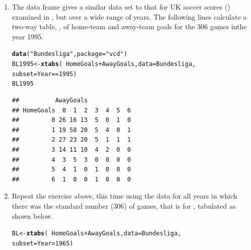 \documentclass[11pt]{book}\usepackage[]{graphicx}\usepackage[]{color}
\makeatletter
\newcommand{\hlnum}[1]{\textcolor[rgb]{0.686,0.059,0.569}{#1}}%
\newcommand{\hlstr}[1]{\textcolor[rgb]{0.192,0.494,0.8}{#1}}%
\newcommand{\hlopt}[1]{\textcolor[rgb]{0,0,0}{#1}}%
\newcommand{\hlstd}[1]{\textcolor[rgb]{0.345,0.345,0.345}{#1}}%
\newcommand{\hlkwb}[1]{\textcolor[rgb]{0.69,0.353,0.396}{#1}}%
\newcommand{\hlkwc}[1]{\textcolor[rgb]{0.333,0.667,0.333}{#1}}%
\newcommand{\hlkwd}[1]{\textcolor[rgb]{0.737,0.353,0.396}{\textbf{#1}}}%
\newenvironment{kframe}{%
 \def\at@end@of@kframe{}%
 \ifinner\ifhmode%
  \def\at@end@of@kframe{\end{minipage}}%
  \begin{minipage}{\columnwidth}%
 \fi\fi%
 \def\FrameCommand##1{\hskip\@totalleftmargin \hskip-\fboxsep
 \colorbox{shadecolor}{##1}\hskip-\fboxsep
     \hskip-\linewidth \hskip-\@totalleftmargin \hskip\columnwidth}%
 \MakeFramed {\advance\hsize-\width
   \@totalleftmargin\z@ \linewidth\hsize
   \@setminipage}}%
 {\par\unskip\endMakeFramed%
 \at@end@of@kframe}
\newenvironment{knitrout}{}{} %
\renewenvironment{knitrout}{\small\renewcommand{\baselinestretch}{.85}}{} %
\makeatother
\begin{document}
\begin{enumerate}
  \item The data frame  gives a similar data set to that for UK soccer scores
  ()
  examined in , but over a wide range of years.  The following lines calculate
  a two-way table, , of home-team and away-team goals
  for the 306 games inthe year 1995.
\begin{knitrout}
\color{fgcolor}\begin{kframe}
\begin{alltt}
\hlkwd{data}\hlstd{(}\hlstr{"Bundesliga"}\hlstd{,} \hlkwc{package}\hlstd{=}\hlstr{"vcd"}\hlstd{)}
\hlstd{BL1995} \hlkwb{<-} \hlkwd{xtabs}\hlstd{(}\hlopt{~}\hlstd{HomeGoals} \hlopt{+} \hlstd{AwayGoals,} \hlkwc{data}\hlstd{=Bundesliga,}
                \hlkwc{subset}\hlstd{= Year}\hlopt{==}\hlnum{1995}\hlstd{)}
\hlstd{BL1995}
\end{alltt}
\begin{verbatim}
##          AwayGoals
## HomeGoals  0  1  2  3  4  5  6
##         0 26 16 13  5  0  1  0
##         1 19 58 20  5  4  0  1
##         2 27 23 20  5  1  1  1
##         3 14 11 10  4  2  0  0
##         4  3  5  3  0  0  0  0
##         5  4  1  0  1  0  0  0
##         6  1  0  0  1  0  0  0
\end{verbatim}
\end{kframe}
\end{knitrout}


  \item \hard 
  Repeat the exercise above, this time using the data for all years in which there was
  the standard number (306) of games, that is for , tabulated as shown below.
\begin{knitrout}
\color{fgcolor}\begin{kframe}
\begin{alltt}
\hlstd{BL} \hlkwb{<-} \hlkwd{xtabs}\hlstd{(}\hlopt{~}\hlstd{HomeGoals} \hlopt{+} \hlstd{AwayGoals,} \hlkwc{data}\hlstd{=Bundesliga,}
            \hlkwc{subset}\hlstd{= Year}\hlopt{>}\hlnum{1965}\hlstd{)}
\end{alltt}
\end{kframe}
\end{knitrout}






\end{enumerate}
\end{document}

